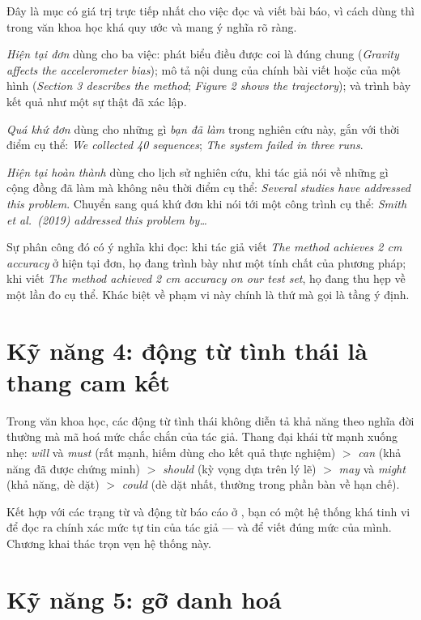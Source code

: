 \documentclass[../../english.tex]{subfiles}
\begin{document}
Đây là mục có giá trị trực tiếp nhất cho việc đọc và viết bài báo, vì cách dùng thì trong văn khoa học khá quy ước và mang ý nghĩa rõ ràng.

\emph{Hiện tại đơn} dùng cho ba việc: phát biểu điều được coi là đúng chung (\emph{Gravity affects the accelerometer bias}); mô tả nội dung của chính bài viết hoặc của một hình (\emph{Section 3 describes the method}; \emph{Figure 2 shows the trajectory}); và trình bày kết quả như một sự thật đã xác lập.

\emph{Quá khứ đơn} dùng cho những gì \emph{bạn đã làm} trong nghiên cứu này, gắn với thời điểm cụ thể: \emph{We collected 40 sequences}; \emph{The system failed in three runs}.

\emph{Hiện tại hoàn thành} dùng cho lịch sử nghiên cứu, khi tác giả nói về những gì cộng đồng đã làm mà không nêu thời điểm cụ thể: \emph{Several studies have addressed this problem}. Chuyển sang quá khứ đơn khi nói tới một công trình cụ thể: \emph{Smith et al.\ (2019) addressed this problem by\ldots}

Sự phân công đó có ý nghĩa khi đọc: khi tác giả viết \emph{The method achieves 2 cm accuracy} ở hiện tại đơn, họ đang trình bày như một tính chất của phương pháp; khi viết \emph{The method achieved 2 cm accuracy on our test set}, họ đang thu hẹp về một lần đo cụ thể. Khác biệt về phạm vi này chính là thứ mà  gọi là tầng ý định.

\section{Kỹ năng 4: động từ tình thái là thang cam kết}

Trong văn khoa học, các động từ tình thái không diễn tả khả năng theo nghĩa đời thường mà mã hoá mức chắc chắn của tác giả. Thang đại khái từ mạnh xuống nhẹ: \emph{will} và \emph{must} (rất mạnh, hiếm dùng cho kết quả thực nghiệm) $>$ \emph{can} (khả năng đã được chứng minh) $>$ \emph{should} (kỳ vọng dựa trên lý lẽ) $>$ \emph{may} và \emph{might} (khả năng, dè dặt) $>$ \emph{could} (dè dặt nhất, thường trong phần bàn về hạn chế).

Kết hợp với các trạng từ và động từ báo cáo ở , bạn có một hệ thống khá tinh vi để đọc ra chính xác mức tự tin của tác giả --- và để viết đúng mức của mình. Chương  khai thác trọn vẹn hệ thống này.

\section{Kỹ năng 5: gỡ danh hoá}
\end{document}
